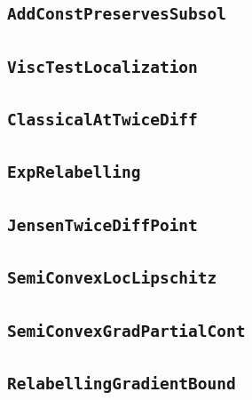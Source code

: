 \documentclass[11pt]{amsart}
\theoremstyle{definition}
\begin{document}
\subsection{\texorpdfstring{\texttt{AddConstPreservesSubsol}}{AddConstPreservesSubsol}}\label{node:AddConstPreservesSubsol}


\subsection{\texorpdfstring{\texttt{ViscTestLocalization}}{ViscTestLocalization}}\label{node:ViscTestLocalization}


\subsection{\texorpdfstring{\texttt{ClassicalAtTwiceDiff}}{ClassicalAtTwiceDiff}}\label{node:ClassicalAtTwiceDiff}


\subsection{\texorpdfstring{\texttt{ExpRelabelling}}{ExpRelabelling}}\label{node:ExpRelabelling}


\subsection{\texorpdfstring{\texttt{JensenTwiceDiffPoint}}{JensenTwiceDiffPoint}}\label{node:JensenTwiceDiffPoint}


\subsection{\texorpdfstring{\texttt{SemiConvexLocLipschitz}}{SemiConvexLocLipschitz}}\label{node:SemiConvexLocLipschitz}


\subsection{\texorpdfstring{\texttt{SemiConvexGradPartialCont}}{SemiConvexGradPartialCont}}\label{node:SemiConvexGradPartialCont}


\subsection{\texorpdfstring{\texttt{RelabellingGradientBound}}{RelabellingGradientBound}}\label{node:RelabellingGradientBound}

\end{document}
